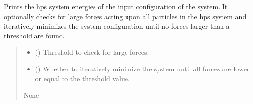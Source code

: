 \documentclass[letterpaper,10pt,english]{sphinxmanual}
\begin{document}
\begin{fulllineitems}
\begin{fulllineitems}
\label{\detokenize{modules/system:hps.core.system.checkLargeForces}}
\pysigstartsignatures
{}
\pysigstopsignatures
\sphinxAtStartPar
Prints the hps system energies of the input configuration of the
system. It optionally checks for large forces acting upon all
particles in the hps system and iteratively minimizes the system
configuration until no forces larger than a threshold are found.
\begin{quote}\begin{description}
\begin{itemize}
\item {} 
\sphinxAtStartPar
{} (\sphinxstyleliteralemphasis{\sphinxupquote{(}}\sphinxstyleliteralemphasis{\sphinxupquote{, }}\sphinxstyleliteralemphasis{\sphinxupquote{)}}) \textendash{} Threshold to check for large forces.

\item {} 
\sphinxAtStartPar
{} (\sphinxstyleliteralemphasis{\sphinxupquote{(}}\sphinxstyleliteralemphasis{\sphinxupquote{, }}\sphinxstyleliteralemphasis{\sphinxupquote{)}}) \textendash{} Whether to iteratively minimize the system until all forces are lower or equal to
the threshold value.

\end{itemize}

\sphinxAtStartPar
None

\end{description}\end{quote}

\end{fulllineitems}



\end{fulllineitems}
\end{document}
